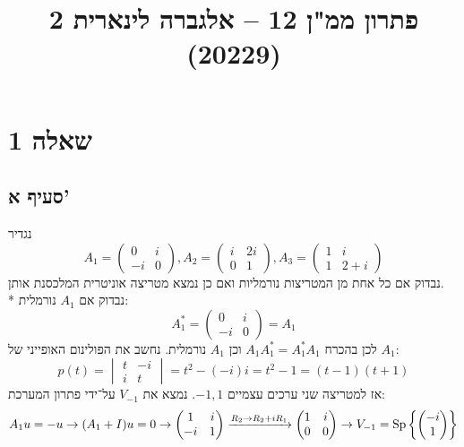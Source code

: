 

\title{פתרון ממ"ן 12 – אלגברה לינארית 2 (20229)}


\maketitle

\section{שאלה 1}
\subsection{סעיף א'}
נגדיר
\[
	A_1 = \begin{pmatrix}
		0 & i \\
		-i & 0
	\end{pmatrix},
	A_2 = \begin{pmatrix}
		i & 2i \\
		0 & 1
	\end{pmatrix},
	A_3 = \begin{pmatrix}
		1 & i \\
		1 & 2 + i
	\end{pmatrix}
\]
נבדוק אם כל אחת מן המטריצות נורמליות ואם כן נמצא מטריצה אוניטרית המלכסנת אותן. \\*
נבדוק אם $A_1$ נורמלית:
\[
	A_1^* = \begin{pmatrix}
		0 & i \\
		-i & 0
	\end{pmatrix} = A_1
\]
לכן בהכרח $A_1 A_1^* = A_1^* A_1$ וכן $A_1$ נורמלית.
נחשב את הפולינום האופייני של $A_1$:
\[
	p(t) = \begin{vmatrix}
		t & -i \\
		i & t
	\end{vmatrix}
	= t^2 - (-i)i = t^2 - 1 = (t - 1)(t + 1)
\]
אז למטריצה שני ערכים עצמיים $-1, 1$.
נמצא את $V_{-1}$ על־ידי פתרון המערכת:
\[
	A_1 u = -u \rightarrow (A_1 + I) u = 0 \rightarrow \begin{pmatrix}
		1 & i \\
		-i & 1
	\end{pmatrix}
	\xrightarrow{R_2 \to R_2 + iR_1}
	\begin{pmatrix}
		1 & i \\
		0 & 0
	\end{pmatrix}
	\rightarrow
	V_{-1} = \operatorname{Sp}\left\{ \begin{pmatrix} -i \\ 1 \end{pmatrix} \right\}
\]
